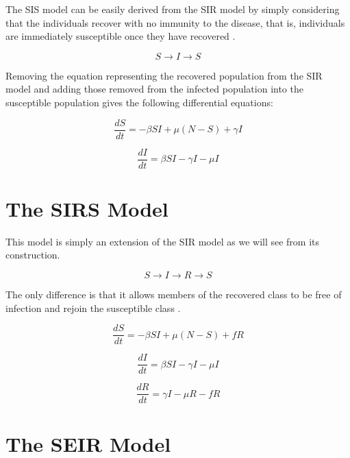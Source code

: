 The SIS model can be easily derived from the SIR model by simply considering that the individuals recover with no immunity to the disease, that is, individuals are immediately susceptible once they have recovered \cite{bib9}.

\begin{equation}
S \rightarrow I \rightarrow S
\end{equation}

Removing the equation representing the recovered population from the SIR model and adding those removed from the infected population into the susceptible population gives the following differential equations:

\begin{equation}
\frac{dS}{dt} = -\beta S I + \mu(N - S) + \gamma I
\end{equation}

\begin{equation}
\frac{dI}{dt} = \beta S I - \gamma I - \mu I
\end{equation}

\section{The SIRS Model}

This model is simply an extension of the SIR model as we will see from its construction.

\begin{equation}
S \rightarrow I \rightarrow R \rightarrow S
\end{equation}

The only difference is that it allows members of the recovered class to be free of infection and rejoin the susceptible class \cite{bib9}.

\begin{equation}
\frac{dS}{dt} = -\beta S I + \mu(N - S) + f R
\end{equation}

\begin{equation}
\frac{dI}{dt} = \beta S I - \gamma I - \mu I
\end{equation}

\begin{equation}
\frac{dR}{dt} = \gamma I - \mu R - f R
\end{equation}


\section{The SEIR Model}

